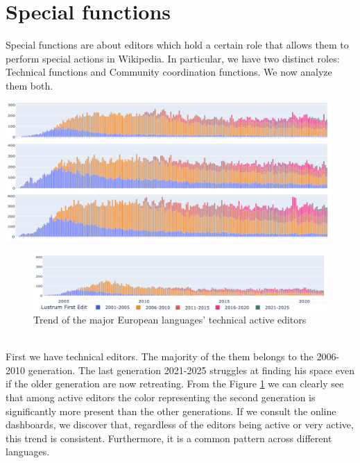 \section{Special functions}
\label{sec:special_conclusion}

Special functions are about editors which hold a certain role that allows them to perform special actions in Wikipedia. In particular, we have two distinct roles: Technical functions and Community coordination functions. We now analyze them both.

\includegraphics[width=470px]{img/tech_trend.png}
\begin{figure}[h]
    \centering
    
    \includegraphics[width=470px]{img/tech_trend1.png}
    \caption{Trend of the major European languages' technical active editors}
    \label{fig:tech_trend}
\end{figure}
\pagebreak
\\
First we have technical editors. The majority of the them belongs to the 2006-2010 generation. The last generation 2021-2025 struggles at finding his space even if the older generation are now retreating.  From the Figure \ref{fig:tech_trend} we can clearly see that among active editors the color representing the second generation is significantly more present than the other generations. If we consult the online dashboards, we discover that, regardless of the editors being active or very active, this trend is consistent. Furthermore, it is a common pattern across different languages.

